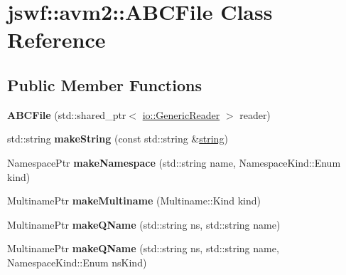 \hypertarget{classjswf_1_1avm2_1_1_a_b_c_file}{\section{jswf\+:\+:avm2\+:\+:A\+B\+C\+File Class Reference}
\label{classjswf_1_1avm2_1_1_a_b_c_file}
}
\subsection*{Public Member Functions}
\begin{DoxyCompactItemize}
\item 
\hypertarget{classjswf_1_1avm2_1_1_a_b_c_file_ab739ae294df745a71260b96c95428a4f}{{\bfseries A\+B\+C\+File} (std\+::shared\+\_\+ptr$<$ \hyperlink{classjswf_1_1io_1_1_generic_reader}{io\+::\+Generic\+Reader} $>$ reader)}\label{classjswf_1_1avm2_1_1_a_b_c_file_ab739ae294df745a71260b96c95428a4f}

\item 
\hypertarget{classjswf_1_1avm2_1_1_a_b_c_file_a47de95242dca14baa0a70b0d356f4340}{std\+::string {\bfseries make\+String} (const std\+::string \&\hyperlink{namespacejswf_a755127d61081aa8af105eb800aa2c1ec}{string})}\label{classjswf_1_1avm2_1_1_a_b_c_file_a47de95242dca14baa0a70b0d356f4340}

\item 
\hypertarget{classjswf_1_1avm2_1_1_a_b_c_file_af4e2a6875063c91229517d469759d6fa}{Namespace\+Ptr {\bfseries make\+Namespace} (std\+::string name, Namespace\+Kind\+::\+Enum kind)}\label{classjswf_1_1avm2_1_1_a_b_c_file_af4e2a6875063c91229517d469759d6fa}

\item 
\hypertarget{classjswf_1_1avm2_1_1_a_b_c_file_a83cf29511a52d591a53910ce0e963b21}{Multiname\+Ptr {\bfseries make\+Multiname} (Multiname\+::\+Kind kind)}\label{classjswf_1_1avm2_1_1_a_b_c_file_a83cf29511a52d591a53910ce0e963b21}

\item 
\hypertarget{classjswf_1_1avm2_1_1_a_b_c_file_a904dfbd749d52aa82c435535f647ddd0}{Multiname\+Ptr {\bfseries make\+Q\+Name} (std\+::string ns, std\+::string name)}\label{classjswf_1_1avm2_1_1_a_b_c_file_a904dfbd749d52aa82c435535f647ddd0}

\item 
\hypertarget{classjswf_1_1avm2_1_1_a_b_c_file_afd3b56125df9dba09a7480769069f6e7}{Multiname\+Ptr {\bfseries make\+Q\+Name} (std\+::string ns, std\+::string name, Namespace\+Kind\+::\+Enum ns\+Kind)}\label{classjswf_1_1avm2_1_1_a_b_c_file_afd3b56125df9dba09a7480769069f6e7}


\end{DoxyCompactItemize}
